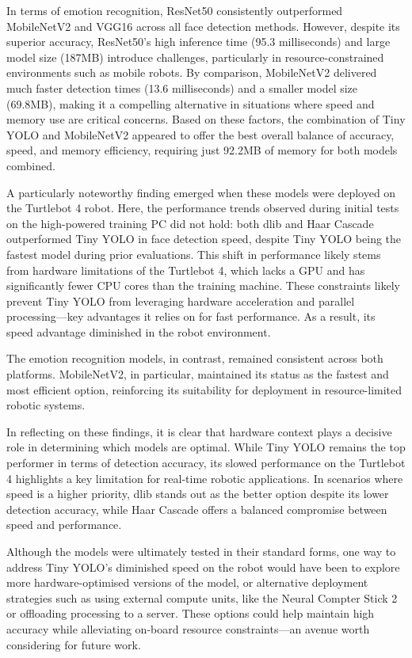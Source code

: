 In terms of emotion recognition, ResNet50 consistently outperformed MobileNetV2 and VGG16 across all face detection methods. However, despite its superior accuracy, ResNet50's high inference time (95.3 milliseconds) and large model size (187MB) introduce challenges, particularly in resource-constrained environments such as mobile robots. By comparison, MobileNetV2 delivered much faster detection times (13.6 milliseconds) and a smaller model size (69.8MB), making it a compelling alternative in situations where speed and memory use are critical concerns. Based on these factors, the combination of Tiny YOLO and MobileNetV2 appeared to offer the best overall balance of accuracy, speed, and memory efficiency, requiring just 92.2MB of memory for both models combined.

A particularly noteworthy finding emerged when these models were deployed on the Turtlebot 4 robot. Here, the performance trends observed during initial tests on the high-powered training PC did not hold: both dlib and Haar Cascade outperformed Tiny YOLO in face detection speed, despite Tiny YOLO being the fastest model during prior evaluations. This shift in performance likely stems from hardware limitations of the Turtlebot 4, which lacks a GPU and has significantly fewer CPU cores than the training machine. These constraints likely prevent Tiny YOLO from leveraging hardware acceleration and parallel processing—key advantages it relies on for fast performance. As a result, its speed advantage diminished in the robot environment.

The emotion recognition models, in contrast, remained consistent across both platforms. MobileNetV2, in particular, maintained its status as the fastest and most efficient option, reinforcing its suitability for deployment in resource-limited robotic systems.

In reflecting on these findings, it is clear that hardware context plays a decisive role in determining which models are optimal. While Tiny YOLO remains the top performer in terms of detection accuracy, its slowed performance on the Turtlebot 4 highlights a key limitation for real-time robotic applications. In scenarios where speed is a higher priority, dlib stands out as the better option despite its lower detection accuracy, while Haar Cascade offers a balanced compromise between speed and performance.

Although the models were ultimately tested in their standard forms, one way to address Tiny YOLO's diminished speed on the robot would have been to explore more hardware-optimised versions of the model, or alternative deployment strategies such as using external compute units, like the Neural Compter Stick 2 or offloading processing to a server. These options could help maintain high accuracy while alleviating on-board resource constraints—an avenue worth considering for future work.

